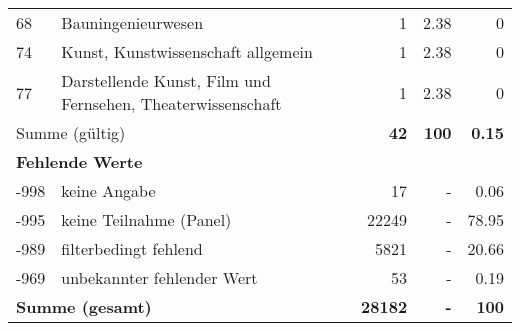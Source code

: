 \begin{longtable}{lXrrr}
        68 & \multicolumn{1}{X}{Bauningenieurwesen} & %
          \num{1} &
          \num[round-mode=places,round-precision=2]{2,38} &
          \num[round-mode=places,round-precision=2]{0} \\

        74 & \multicolumn{1}{X}{Kunst, Kunstwissenschaft allgemein} & %
          \num{1} &
          \num[round-mode=places,round-precision=2]{2,38} &
          \num[round-mode=places,round-precision=2]{0} \\

        77 & \multicolumn{1}{X}{Darstellende Kunst, Film und Fernsehen, Theaterwissenschaft} & %
          \num{1} &
          \num[round-mode=places,round-precision=2]{2,38} &
          \num[round-mode=places,round-precision=2]{0} \\

     \midrule
     \multicolumn{2}{l}{Summe (gültig)} &
       \textbf{\num{42}} &
     \textbf{100} &
       \textbf{\num[round-mode=places,round-precision=2]{0,15}} \\
     \multicolumn{5}{l}{\textbf{Fehlende Werte}}\\
       -998 &
       keine Angabe &
         \num{17} &
        - &
         \num[round-mode=places,round-precision=2]{0,06} \\
       -995 &
       keine Teilnahme (Panel) &
         \num{22249} &
        - &
         \num[round-mode=places,round-precision=2]{78,95} \\
       -989 &
       filterbedingt fehlend &
         \num{5821} &
        - &
         \num[round-mode=places,round-precision=2]{20,66} \\
       -969 &
       unbekannter fehlender Wert &
         \num{53} &
        - &
         \num[round-mode=places,round-precision=2]{0,19} \\
     \midrule
     \multicolumn{2}{l}{\textbf{Summe (gesamt)}} &
          \textbf{\num{28182}} &
        \textbf{-} &
        \textbf{100} \\
     \bottomrule
     \end{longtable}
     
